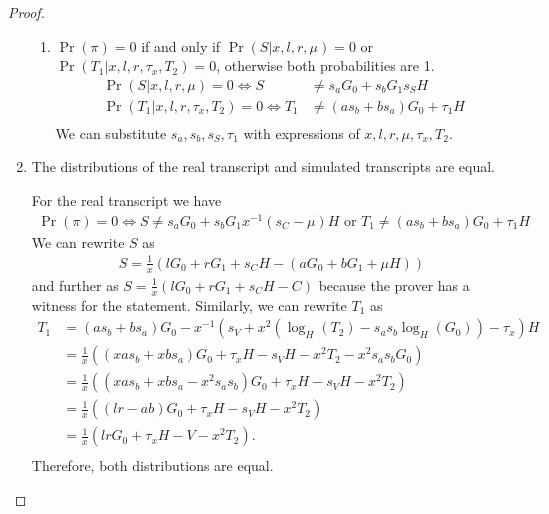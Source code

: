 \begin{proof}
\begin{enumerate}
\begin{innerproof}
\begin{enumerate}
     \item $\Pr(\pi) = 0$ if and only if $\Pr(S| x, l, r, \mu) = 0$ or $\Pr(T_1| x, l, r, \tau_x, T_2) = 0$, otherwise both probabilities are 1.
       \begin{align*}
       \Pr(S| x, l, r, \mu) = 0 \Leftrightarrow S &\ne s_aG_0 + s_bG_1 s_SH\\
       \Pr(T_1| x, l, r, \tau_x, T_2) = 0 \Leftrightarrow T_1 &\ne (as_b + bs_a)G_0 + \tau_1H\\
       \end{align*}
       We can substitute $s_a, s_b, s_S, \tau_1$ with expressions of $x, l, r, \mu, \tau_x, T_2$.
     \end{enumerate}
    \end{innerproof}
  \item The distributions of the real transcript and simulated transcripts are equal.
  \begin{innerproof}
    For the real transcript we have
    \begin{align*}
      \Pr(\pi) = 0 \Leftrightarrow S \ne s_aG_0 + s_bG_1 x^{-1}(s_C - \mu)H \text{ or } T_1 \ne (as_b + bs_a)G_0 + \tau_1H
      \end{align*}
      We can rewrite $S$ as
      \begin{align*}
        S = \frac{1}{x}(lG_0 + rG_1 + s_CH - (aG_0 + bG_1 + \mu H))
      \end{align*}
      and further as $S = \frac{1}{x}(lG_0 + rG_1 + s_CH - C)$ because the prover has a witness for the statement.
      Similarly, we can rewrite $T_1$ as
      \begin{align*}
        T_1 &= (as_b + bs_a)G_0 - x^{-1}(s_V  + x^2(\log_H(T_2) - s_as_b\log_H(G_0)) - \tau_x)H\\
            &= \frac{1}{x}((xas_b + xbs_a)G_0 + \tau_xH - s_VH - x^2T_2 - x^2s_as_bG_0)\\
            &= \frac{1}{x}((xas_b + xbs_a - x^2s_as_b)G_0 + \tau_xH - s_VH - x^2T_2)\\
            &= \frac{1}{x}((lr - ab)G_0 + \tau_xH - s_VH - x^2T_2)\\
            &= \frac{1}{x}(lr G_0 + \tau_xH - V - x^2T_2).\\
      \end{align*}
      Therefore, both distributions are equal.
  \end{innerproof}
 \end{enumerate}
\end{proof}